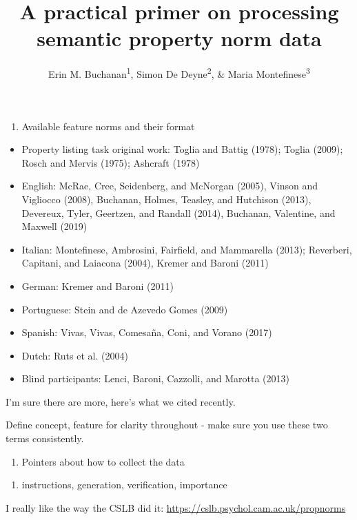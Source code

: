 \documentclass[man]{apa6}
\title{A practical primer on processing semantic property norm data}
\author{Erin M. Buchanan\textsuperscript{1}, Simon De Deyne\textsuperscript{2}, \& Maria Montefinese\textsuperscript{3}}
\date{}
\affiliation{
\vspace{0.5cm}
\textsuperscript{1} Harrisburg University of Science and Technology\\\textsuperscript{2} University of Melbourne\\\textsuperscript{3} University of Padua}
\providecommand{\tightlist}{%
  \setlength{\itemsep}{0pt}\setlength{\parskip}{0pt}}
\begin{document}
\maketitle

\begin{enumerate}
\def\labelenumi{\arabic{enumi}.}
\tightlist
\item
  Available feature norms and their format
\end{enumerate}

\begin{itemize}
\tightlist
\item
  Property listing task original work: Toglia and Battig (1978); Toglia (2009); Rosch and Mervis (1975); Ashcraft (1978)
\item
  English: McRae, Cree, Seidenberg, and McNorgan (2005), Vinson and Vigliocco (2008), Buchanan, Holmes, Teasley, and Hutchison (2013), Devereux, Tyler, Geertzen, and Randall (2014), Buchanan, Valentine, and Maxwell (2019)
\item
  Italian: Montefinese, Ambrosini, Fairfield, and Mammarella (2013); Reverberi, Capitani, and Laiacona (2004), Kremer and Baroni (2011)
\item
  German: Kremer and Baroni (2011)
\item
  Portuguese: Stein and de Azevedo Gomes (2009)
\item
  Spanish: Vivas, Vivas, Comesaña, Coni, and Vorano (2017)
\item
  Dutch: Ruts et al. (2004)
\item
  Blind participants: Lenci, Baroni, Cazzolli, and Marotta (2013)
\end{itemize}

I'm sure there are more, here's what we cited recently.

Define concept, feature for clarity throughout - make sure you use these two terms consistently.

\begin{enumerate}
\def\labelenumi{\arabic{enumi}.}
\setcounter{enumi}{1}
\tightlist
\item
  Pointers about how to collect the data
\end{enumerate}

\begin{enumerate}
\def\labelenumi{\alph{enumi}.}
\tightlist
\item
  instructions, generation, verification, importance
\end{enumerate}

I really like the way the CSLB did it: \url{https://cslb.psychol.cam.ac.uk/propnorms}
\end{document}
